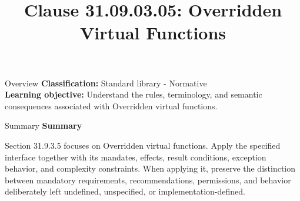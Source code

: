 \documentclass[10pt,letterpaper]{article}
\title{Clause 31.09.03.05: Overridden Virtual Functions}
\author{}
\date{}
\begin{document}
\maketitle
\begin{CornellOverviewBox}{Overview}
\textbf{Classification:} Standard library - Normative\\[2pt]
\textbf{Learning objective:} Understand the rules, terminology, and semantic consequences associated with Overridden virtual functions.
\end{CornellOverviewBox}\begin{CornellSummaryBox}{Summary}
{\sffamily\bfseries\color{Accent} Summary}\par\vspace{3pt}Section 31.9.3.5 focuses on Overridden virtual functions. Apply the specified interface together with its mandates, effects, result conditions, exception behavior, and complexity constraints. When applying it, preserve the distinction between mandatory requirements, recommendations, permissions, and behavior deliberately left undefined, unspecified, or implementation-defined.
\end{CornellSummaryBox}
\end{document}
